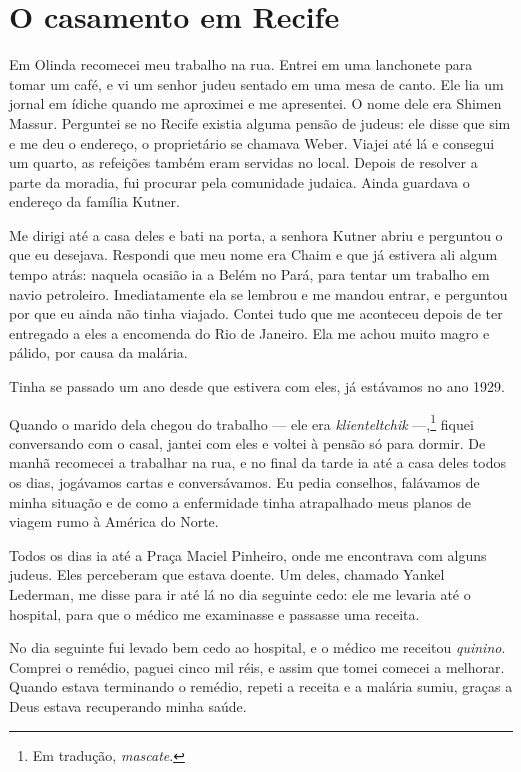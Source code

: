 \chapter{O casamento em Recife}

Em Olinda recomecei meu trabalho na rua. Entrei em uma
lanchonete para tomar um café, e vi um senhor judeu sentado em uma mesa
de canto. Ele lia um jornal em ídiche quando me aproximei e me
apresentei. O nome dele era Shimen Massur. Perguntei se
no Recife existia alguma pensão de judeus: ele disse que sim e
me deu o endereço, o proprietário se chamava Weber. Viajei até lá e
consegui um quarto, as refeições também eram servidas no local.
Depois de resolver a parte da moradia, fui procurar pela comunidade judaica. Ainda
guardava o endereço da família Kutner.

Me dirigi até a casa deles e bati na porta, a senhora Kutner abriu e
perguntou o que eu desejava. Respondi que meu nome era Chaim e que já estivera ali algum tempo
atrás: naquela ocasião ia a Belém no Pará, para tentar um trabalho em navio petroleiro. Imediatamente ela se
lembrou e me mandou entrar, e perguntou por que eu ainda não tinha viajado. 
Contei tudo que me aconteceu depois de ter entregado a eles a encomenda do Rio de Janeiro. Ela me achou muito magro e pálido, por causa da malária.

Tinha se passado um ano desde que estivera com eles, já estávamos no ano
1929.

Quando o marido dela chegou do trabalho --- ele era \textit{klienteltchik} ---,\footnote{Em tradução, \textit{mascate}.} 
fiquei conversando com o casal, jantei com eles e
voltei à pensão só para dormir. De manhã recomecei a trabalhar na rua, e
no final da tarde ia até a casa deles todos os dias, jogávamos cartas e
conversávamos. Eu pedia conselhos, falávamos de minha situação e de como
a enfermidade tinha atrapalhado meus planos de viagem rumo à América do Norte.

Todos os dias ia até a Praça Maciel Pinheiro, onde me encontrava com
alguns judeus. Eles perceberam que estava doente. Um deles,
chamado Yankel Lederman, me disse para ir até lá no dia seguinte cedo: 
ele me levaria até o hospital, para que o médico me examinasse e passasse uma receita.

No dia seguinte fui levado bem cedo ao hospital, e o médico me
receitou \textit{quinino}. Comprei o remédio, paguei cinco mil réis, e assim que
tomei comecei a melhorar. Quando estava terminando o remédio,
repeti a receita e a malária sumiu, graças a Deus estava recuperando 
minha saúde.

